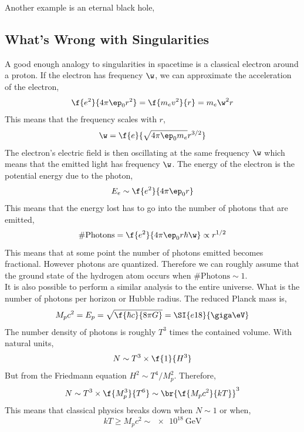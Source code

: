 \documentclass{article}
\begin{document}
Another example is an eternal black hole,
\begin{center}
\end{center}
\begin{center}
\end{center}
\subsection{What's Wrong with Singularities}

A good enough analogy to singularities in spacetime is a classical electron around a proton. If the electron has frequency $\w$, we can approximate the acceleration of the electron,
\[ \f{e^2}{4 \pi \ep_0 r^2} = \f{m_e v^2}{r} = m_e \w^2 r \]
This means that the frequency scales with $r$,
\[ \w = \f{e}{\sqrt{4 \pi \ep_0 m_e } r^{3/2}} \]
The electron's electric field is then oscillating at the same frequency $\w$ which means that the emitted light has frequency $\w$. The energy of the electron is the potential energy due to the photon,
\[ E_e \sim \f{e^2}{4 \pi \ep_0 r} \]
This means that the energy lost has to go into the number of photons that are emitted,
\[ \# \text{Photons} = \f{e^2}{4 \pi \ep_0 r \hbar \w} \propto r^{1/2} \]
This means that at some point the number of photons emitted becomes fractional. However photons are quantized. Therefore we can roughly assume that the ground state of the hydrogen atom occurs when $\# \text{Photons} \sim 1$. \\

It is also possible to perform a similar analysis to the entire universe. What is the number of photons per horizon or Hubble radius. The reduced Planck mass is,
\[ M_p c^2 = E_p = \sqrt{\f{\hbar c}{8 \pi G}} = \SI{e18}{\giga \eV} \]
The number density of photons is roughly $T^3$ times the contained volume. With natural units,
\[ N \sim T^3 \times \f{1}{H^3} \]
But from the Friedmann equation $H^2 \sim T^4 / M_p^2$. Therefore,
\[ N \sim T^3 \times \f{M_p^3}{T^6} \sim \br{\f{M_p c^2}{k T}}^3 \]
This means that classical physics breaks down when $N \sim 1$ or when,
\[ kT \geq M_p c^2 \sim \SI{e18}{\giga \eV} \]
\end{document}
